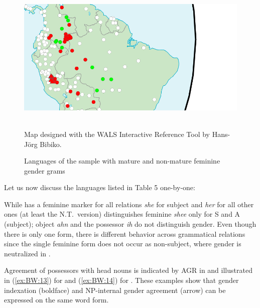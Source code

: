 \documentclass[output=collectionpaper]{langsci/langscibook}
\begin{document}
\begin{figure}
\begin{minipage}[t]{0.3\textwidth}
\includegraphics[width=\textwidth]{figures/12/12-fig1c.png}
\end{minipage}\\
{\small Map designed with the WALS Interactive Reference Tool by Hans-Jörg Bibiko.}
\caption{Languages of the sample with mature and non-mature feminine gender grams}
\label{fig:BW:1}
\end{figure}

Let us now discuss the languages listed in Table 5 one-by-one:

While  has a feminine marker for all relations \textendash{} \textit{she} for subject and \textit{her} for all other ones \textendash{}  (at least the N.T.\ version) distinguishes feminine \textit{shee} only for S and A (subject); object \textit{ahn} and the possessor \textit{ih} do not distinguish gender. Even though there is only one form, there is different behavior across grammatical relations since the single feminine form does not occur as non-subject, where gender is neutralized in .

Agreement of possessors with head nouns is indicated by AGR in  and illustrated in (\ref{ex:BW:13}) for  and (\ref{ex:BW:14}) for . These examples show that gender indexation (boldface) and NP-internal gender agreement (arrow) can be expressed on the same word form.

%
\end{document}
